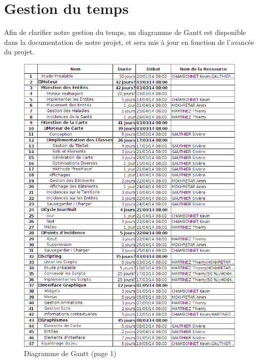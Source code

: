\documentclass[a4paper]{article}
\newcommand{\alinea}{\hspace*{0.5cm}}
\begin{document}
    \section{Gestion du temps}
      \label{GestionTps}
      \alinea Afin de clarifier notre gestion du temps, un diagramme de Gantt est disponible dans la documentation de notre projet, et sera mis à jour en fonction de l'avancée du projet.\\
	  \newpage
      \begin{figure}
        \begin{center}
          \includegraphics[scale=0.5]{img/gantt_1.png}
        \end{center}
        \label{DiagGantt}
        \caption{Diagramme de Gantt (page 1)}
      \end{figure}
      \newpage
\end{document}
